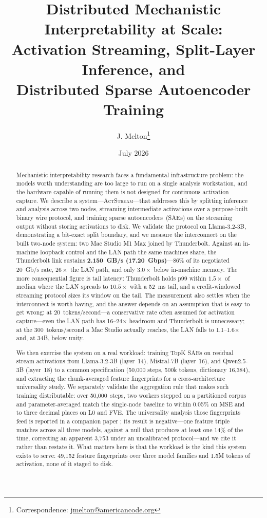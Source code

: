 \documentclass[11pt]{article}
\title{Distributed Mechanistic Interpretability at Scale:\\
Activation Streaming, Split-Layer Inference, and\\
Distributed Sparse Autoencoder Training}
\author[1]{J. Melton\thanks{Correspondence: \href{mailto:jmelton@americancode.org}{jmelton@americancode.org}}}
\affil[1]{American Code Labs}
\date{July 2026}
\newcommand{\actstream}{\textsc{ActStream}}
\begin{document}
\maketitle

\begin{abstract}
Mechanistic interpretability research faces a fundamental infrastructure problem: the models worth understanding are too large to run on a single analysis workstation, and the hardware capable of running them is not designed for continuous activation capture. We describe a system---\actstream{}---that addresses this by splitting inference and analysis across two nodes, streaming intermediate activations over a purpose-built binary wire protocol, and training sparse autoencoders~(SAEs) on the streaming output without storing activations to disk. We validate the protocol on Llama-3.2-3B, demonstrating a bit-exact split boundary, and we measure the interconnect on the built two-node system: two Mac Studio M1 Max joined by Thunderbolt. Against an in-machine loopback control and the LAN path the same machines share, the Thunderbolt link sustains \textbf{2.150~GB/s (17.20~Gbps)}---86\% of its negotiated 20~Gb/s rate, $26\times$ the LAN path, and only $3.0\times$ below in-machine memory. The more consequential figure is tail latency: Thunderbolt holds p99 within $1.5\times$ of median where the LAN spreads to $10.5\times$ with a 52~ms tail, and a credit-windowed streaming protocol sizes its window on the tail. The measurement also settles when the interconnect is worth having, and the answer depends on an assumption that is easy to get wrong: at 20~tokens/second---a conservative rate often assumed for activation capture---even the LAN path has 16--24$\times$ headroom and Thunderbolt is unnecessary; at the 300~tokens/second a Mac Studio actually reaches, the LAN falls to 1.1--1.6$\times$ and, at 34B, below unity.

We then exercise the system on a real workload: training TopK SAEs on residual stream activations from Llama-3.2-3B (layer~14), Mistral-7B (layer~16), and Qwen2.5-3B (layer~18) to a common specification (50,000 steps, 500k tokens, dictionary 16{,}384), and extracting the chunk-averaged feature fingerprints for a cross-architecture universality study. We separately validate the aggregation rule that makes such training distributable: over 50,000~steps, two workers stepped on a partitioned corpus and parameter-averaged match the single-node baseline to within 0.05\% on MSE and to three decimal places on L0 and FVE. The universality analysis those fingerprints feed is reported in a companion paper \citep{melton2026saecomparison}; its result is negative---one feature triple matches across all three models, against a null that produces at least one 14\% of the time, correcting an apparent 3{,}753 under an uncalibrated protocol---and we cite it rather than restate it. What matters here is that the workload is the kind this system exists to serve: 49{,}152 feature fingerprints over three model families and 1.5M tokens of activation, none of it staged to disk.


\end{abstract}
\end{document}
